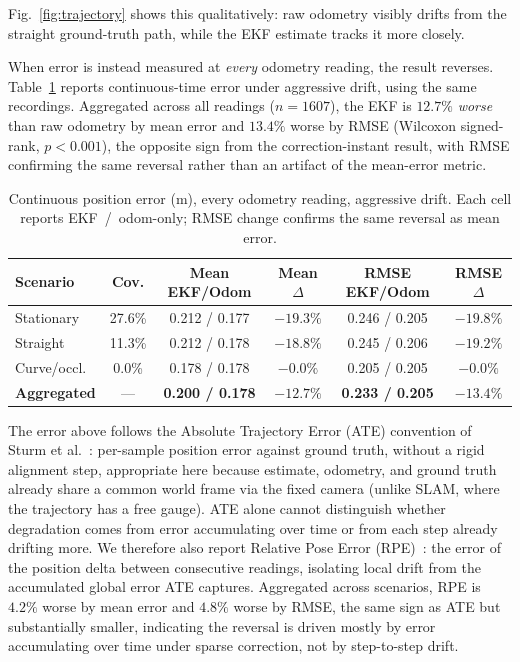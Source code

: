 \documentclass[runningheads]{llncs}
\renewcommand{\paragraph}[1]{\vspace{4pt}\noindent{\em #1}\enspace}
\begin{document}
Fig.~\ref{fig:trajectory} shows this qualitatively: raw odometry
visibly drifts from the straight ground-truth path, while the EKF
estimate tracks it more closely.

\paragraph{Continuous error: the central finding.}
When error is instead measured at \emph{every} odometry reading, the
result reverses. Table~\ref{tab:continuous-error} reports
continuous-time error under aggressive drift, using the same
recordings. Aggregated across all readings ($n=1607$), the EKF is
$12.7\%$ \emph{worse} than raw odometry by mean error and $13.4\%$
worse by RMSE (Wilcoxon signed-rank, $p<0.001$), the opposite sign
from the correction-instant result, with RMSE confirming the same
reversal rather than an artifact of the mean-error metric.

\begin{table}
\caption{Continuous position error (m), every odometry reading,
aggressive drift. Each cell reports EKF~/~odom-only; RMSE change
confirms the same reversal as mean error.}\label{tab:continuous-error}
\footnotesize
\begin{tabular}{|l|c|c|c|c|c|}
\hline
\textbf{Scenario} & \textbf{Cov.} & \textbf{Mean EKF/Odom} & \textbf{Mean $\Delta$} & \textbf{RMSE EKF/Odom} & \textbf{RMSE $\Delta$} \\
\hline
Stationary & 27.6\% & 0.212 / 0.177 & $-19.3\%$ & 0.246 / 0.205 & $-19.8\%$ \\
\hline
Straight & 11.3\% & 0.212 / 0.178 & $-18.8\%$ & 0.245 / 0.206 & $-19.2\%$ \\
\hline
Curve/occl. & 0.0\% & 0.178 / 0.178 & $-0.0\%$ & 0.205 / 0.205 & $-0.0\%$ \\
\hline
\textbf{Aggregated} & --- & \textbf{0.200 / 0.178} & $\mathbf{-12.7\%}$ & \textbf{0.233 / 0.205} & $\mathbf{-13.4\%}$ \\
\hline
\end{tabular}
\end{table}

The error above follows the Absolute Trajectory Error (ATE) convention
of Sturm et al.~\cite{sturm2012tum}: per-sample position error against
ground truth, without a rigid alignment step, appropriate here because
estimate, odometry, and ground truth already share a common world
frame via the fixed camera (unlike SLAM, where the trajectory has a
free gauge). ATE alone cannot distinguish whether degradation comes
from error accumulating over time or from each step already drifting
more. We therefore also report Relative Pose Error
(RPE)~\cite{sturm2012tum}: the error of the position delta between
consecutive readings, isolating local drift from the accumulated
global error ATE captures. Aggregated across scenarios, RPE is $4.2\%$
worse by mean error and $4.8\%$ worse by RMSE, the same sign as ATE
but substantially smaller, indicating the reversal is driven mostly by
error accumulating over time under sparse correction, not by
step-to-step drift.
\end{document}
